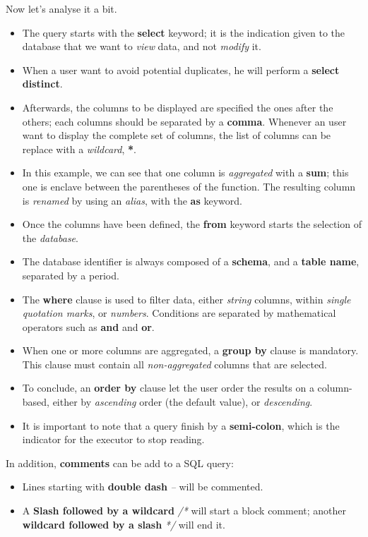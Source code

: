 \documentclass[12pt, letterpaper]{report}
\begin{document}
Now let's analyse it a bit.
\begin{itemize}
	\item The query starts with the \textbf{select} keyword; it is the indication given to the database that we want to \textit{view} data, and not \textit{modify} it.
	\item When a user want to avoid potential duplicates, he will perform a  \textbf{select distinct}.
	\item Afterwards, the columns to be displayed are specified the ones after the others; each columns should be separated by a \textbf{comma}.
	Whenever an user want to display the complete set of columns, the list of columns can be replace with a \textit{wildcard}, \textbf{*}.
	\item In this example, we can see that one column is \textit{aggregated} with a \textbf{sum}; this one is enclave between the parentheses of the function.
	The resulting column is \textit{renamed} by using an \textit{alias}, with the \textbf{as} keyword.
	\item Once the columns have been defined, the \textbf{from} keyword starts the selection of the \textit{database}.
	\item The database identifier is always composed of a \textbf{schema}, and a \textbf{table name}, separated by a period.
	\item The \textbf{where} clause is used to filter data, either \textit{string} columns, within \textit{single quotation marks}, or \textit{numbers}.
	Conditions are separated by mathematical operators such as \textbf{and} and \textbf{or}.
	\item When one or more columns are aggregated, a \textbf{group by} clause is mandatory.
	This clause must contain all \textit{non-aggregated} columns that are selected.
	\item To conclude, an \textbf{order by} clause let the user order the results on a column-based, either by \textit{ascending} order (the default value), or \textit{descending}.
	\item It is important to note that a query finish by a \textbf{semi-colon}, which is the indicator for the executor to stop reading.
\end{itemize}

In addition, \textbf{comments} can be add to a SQL query:
\begin{itemize}
	\item Lines starting with \textbf{double dash} \textit{--} will be commented.
	\item A \textbf{Slash followed by a wildcard} \textit{/*} will start a block comment;
	another \textbf{wildcard followed by a slash} \textit{*/} will end it.
\end{itemize}
\end{document}
